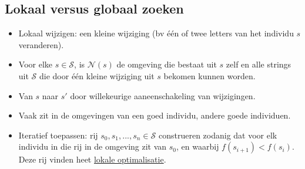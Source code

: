 \documentclass{report}
\begin{document}
\begin{itemize}
\section{Lokaal versus globaal zoeken}
\begin{itemize}
	\item[\info] Lokaal wijzigen: een kleine wijziging (bv één of twee letters van het individu $s$ veranderen).
	\item[\info] Voor elke $s \in \mathcal{S}$, is $\mathcal{N}(s)$ de omgeving die bestaat uit $s$ zelf en alle strings uit $\mathcal{S}$ die door één kleine wijziging uit $s$ bekomen kunnen worden.
	\item[\info] Van $s$ naar $s'$ door willekeurige aaneenschakeling van wijzigingen.
	\item[\info] Vaak zit in de omgevingen van een goed individu, andere goede individuen.
	\item[\info] Iteratief toepassen: rij $s_0, s_1,...,s_n \in \mathcal{S}$ construeren zodanig dat voor elk individu in die rij in de omgeving zit van $s_0$, en waarbij $f(s_{i + 1}) < f(s_i)$. Deze rij vinden heet \underline{lokale optimalisatie}.
\end{itemize}

\end{itemize}
\end{document}

